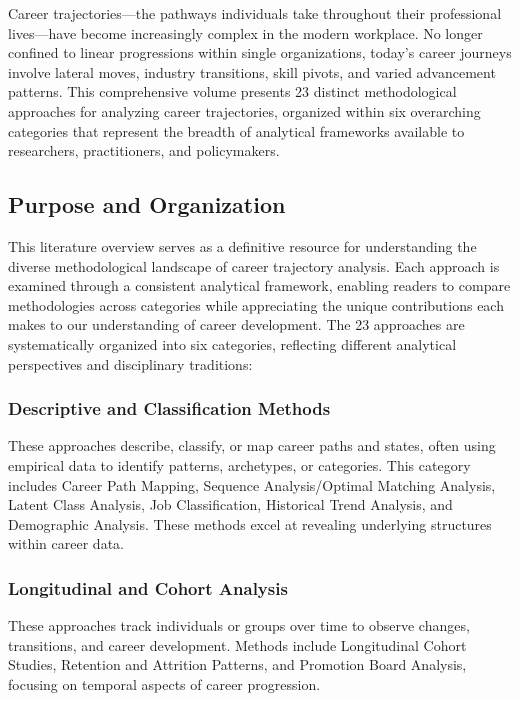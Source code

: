 \documentclass[./main.tex]{subfiles}
\begin{document}
Career trajectories---the pathways individuals take throughout their
professional lives---have become increasingly complex in the modern
workplace. No longer confined to linear progressions within single
organizations, today's career journeys involve lateral moves, industry
transitions, skill pivots, and varied advancement patterns. This
comprehensive volume presents 23 distinct methodological approaches for
analyzing career trajectories, organized within six overarching
categories that represent the breadth of analytical frameworks available
to researchers, practitioners, and policymakers.

\subsection{Purpose and Organization}\label{purpose-and-organization}

This literature overview serves as a definitive resource for
understanding the diverse methodological landscape of career trajectory
analysis. Each approach is examined through a consistent analytical
framework, enabling readers to compare methodologies across categories
while appreciating the unique contributions each makes to our
understanding of career development. The 23 approaches are
systematically organized into six categories, reflecting different
analytical perspectives and disciplinary traditions:

\subsubsection{Descriptive and Classification
Methods}\label{descriptive-and-classification-methods}

These approaches describe, classify, or map career paths and states,
often using empirical data to identify patterns, archetypes, or
categories. This category includes Career Path Mapping, Sequence
Analysis/Optimal Matching Analysis, Latent Class Analysis, Job
Classification, Historical Trend Analysis, and Demographic Analysis.
These methods excel at revealing underlying structures within career
data.

\subsubsection{Longitudinal and Cohort
Analysis}\label{longitudinal-and-cohort-analysis}

These approaches track individuals or groups over time to observe
changes, transitions, and career development. Methods include
Longitudinal Cohort Studies, Retention and Attrition Patterns, and
Promotion Board Analysis, focusing on temporal aspects of career
progression.
\end{document}
